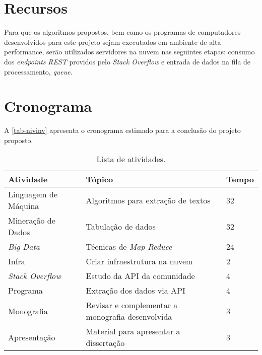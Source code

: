 \chapter{Recursos}
Para que os algoritmos propostos, bem como os programas de computadores desenvolvidos para este projeto sejam executados em ambiente de alta performance, serão utilizados servidores na nuvem nas seguintes etapas: consumo dos \textit{endpoints} \emph{REST} providos pelo \textit{Stack Overflow} e entrada de dados na fila de processamento, \textit{queue}.

\chapter{Cronograma}

A \autoref{tab-nivinv} apresenta o cronograma estimado para a conclusão do projeto proposto.

\begin{table}[htb]
\ABNTEXfontereduzida
\caption[Cronograma]{Lista de atividades.}
\label{tab-nivinv}
\begin{tabular}{p{3.75cm}|p{9.0cm}|p{1.5cm}}
   \textbf{Atividade} & \textbf{Tópico}  & \textbf{Tempo}  \\
    \hline
    Linguagem de Máquina & Algoritmos para extração de textos & 32 \\
    \hline
    Mineração de Dados & Tabulação de dados & 32  \\
    \hline
    \textit{Big Data} & Técnicas de \textit{Map Reduce} & 24  \\
	\hline
    Infra & Criar infraestrutura na nuvem & 2  \\
    \hline
    \textit{Stack Overflow} & Estudo da API da comunidade & 4  \\
    \hline
    Programa & Extração dos dados via API & 4  \\    
    \hline
    Monografia & Revisar e complementar a monografia desenvolvida & 3  \\    
     \hline
    Apresentação & Material para apresentar a dissertação & 3  \\        
\end{tabular}
\end{table}





